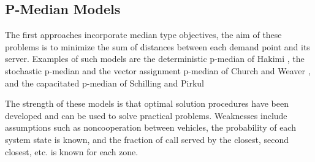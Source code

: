 \subsection{P-Median Models}
The first approaches
incorporate median type objectives,
the aim of these problems
is to minimize the sum of distances
between each demand point
and its server.
Examples of such models are
the deterministic p-median of Hakimi \cite{hakimi1964optimum},
the stochastic p-median and the vector assignment p-median of Church and Weaver
\cite{weaver1983computational,weaver1985median},
and the capacitated p-median of Schilling and Pirkul \cite{pirkul1988siting}

The strength of these models
is that optimal solution procedures
have been developed
and can be used to solve practical problems.
Weaknesses include assumptions
such as noncooperation between vehicles,
the probability of each system state is known,
and the fraction of call
served by the closest, second closest, etc.
is known for each zone.
